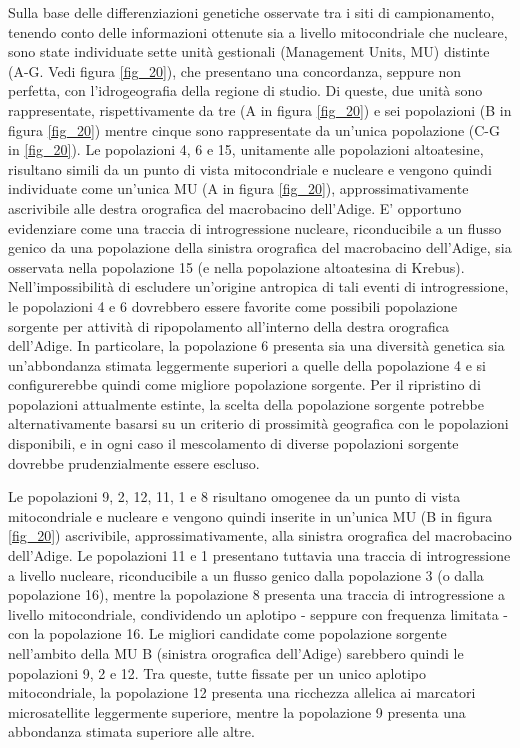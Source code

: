 \documentclass[11pt,a4paper,italian,twoside,openany]{memoir}
\begin{document}
Sulla base delle differenziazioni genetiche osservate tra i siti di campionamento, tenendo conto delle informazioni ottenute sia a livello mitocondriale che nucleare, sono state individuate sette unità gestionali (Management Units, MU) distinte (A-G. Vedi figura \ref{fig_20}), che presentano una concordanza, seppure non perfetta, con l'idrogeografia della regione di studio. Di queste, due unità sono rappresentate, rispettivamente da tre (A in figura \ref{fig_20}) e sei popolazioni (B in figura \ref{fig_20}) mentre cinque sono rappresentate da un'unica popolazione (C-G in \ref{fig_20}).
Le popolazioni 4, 6 e 15, unitamente alle popolazioni altoatesine, risultano simili da un punto di vista mitocondriale e nucleare e vengono quindi individuate come un'unica MU (A in figura \ref{fig_20}), approssimativamente ascrivibile alle destra orografica del macrobacino dell'Adige. E' opportuno evidenziare come una traccia di introgressione nucleare, riconducibile a un flusso genico da una popolazione della sinistra orografica del macrobacino dell'Adige, sia osservata nella popolazione 15 (e nella popolazione altoatesina di Krebus). Nell'impossibilità di escludere un'origine antropica di tali eventi di introgressione, le popolazioni 4 e 6 dovrebbero essere favorite come possibili popolazione sorgente per attività di ripopolamento all'interno della destra orografica dell'Adige. In particolare, la popolazione 6 presenta sia una diversità genetica sia un'abbondanza stimata leggermente superiori a quelle della popolazione 4 e si configurerebbe quindi come migliore popolazione sorgente. Per il ripristino di popolazioni attualmente estinte, la scelta della popolazione sorgente potrebbe alternativamente basarsi su un criterio di prossimità geografica con le popolazioni disponibili, e in ogni caso il mescolamento di diverse popolazioni sorgente dovrebbe prudenzialmente essere escluso.

Le popolazioni 9, 2, 12, 11, 1 e 8 risultano omogenee da un punto di vista mitocondriale e nucleare e vengono quindi inserite in un'unica MU (B in figura \ref{fig_20}) ascrivibile, approssimativamente, alla sinistra orografica del macrobacino dell'Adige. Le popolazioni 11 e 1 presentano tuttavia una traccia di introgressione a livello nucleare, riconducibile a un flusso genico dalla popolazione 3 (o dalla popolazione 16), mentre la popolazione 8 presenta una traccia di introgressione a livello mitocondriale, condividendo un aplotipo - seppure con frequenza limitata - con la popolazione 16. Le migliori candidate come popolazione sorgente nell'ambito della MU B (sinistra orografica dell'Adige) sarebbero quindi le popolazioni 9, 2 e 12. Tra queste, tutte fissate per un unico aplotipo mitocondriale, la popolazione 12 presenta una ricchezza allelica ai marcatori microsatellite leggermente superiore, mentre la popolazione 9 presenta una abbondanza stimata superiore alle altre.
\end{document}
